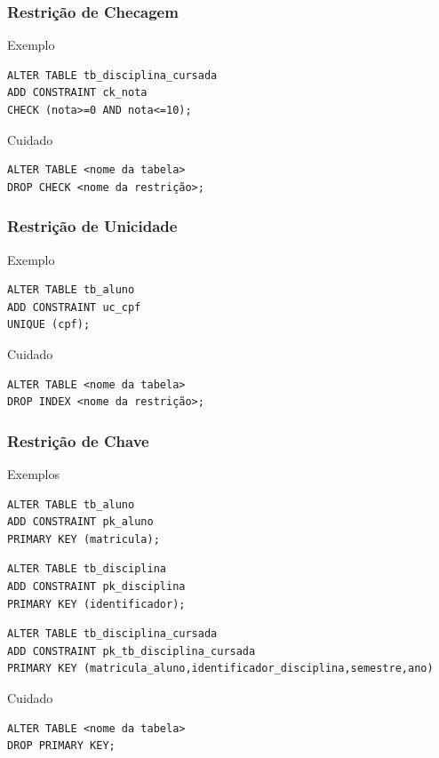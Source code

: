 \documentclass{beamer}
\begin{document}
\begin{frame}[fragile]
\frametitle{Restrição de Checagem}

\begin{exampleblock}{Exemplo}
\begin{lstlisting}
ALTER TABLE tb_disciplina_cursada
ADD CONSTRAINT ck_nota 
CHECK (nota>=0 AND nota<=10);
\end{lstlisting}
\end{exampleblock}\vfill

\begin{alertblock}{Cuidado}
	\begin{lstlisting}
ALTER TABLE <nome da tabela>
DROP CHECK <nome da restrição>;
	\end{lstlisting}
\end{alertblock}
\end{frame}

\begin{frame}[fragile]
\frametitle{Restrição de Unicidade}

\begin{exampleblock}{Exemplo}
	\begin{lstlisting}
ALTER TABLE tb_aluno
ADD CONSTRAINT uc_cpf
UNIQUE (cpf);
	\end{lstlisting}
\end{exampleblock}\vfill

\begin{alertblock}{Cuidado}
	\begin{lstlisting}
ALTER TABLE <nome da tabela>
DROP INDEX <nome da restrição>;
	\end{lstlisting}
\end{alertblock}
\end{frame}

\begin{frame}[fragile]
\frametitle{Restrição de Chave}

\begin{exampleblock}{Exemplos}
	\begin{lstlisting}
ALTER TABLE tb_aluno
ADD CONSTRAINT pk_aluno 
PRIMARY KEY (matricula);
	\end{lstlisting}

	\begin{lstlisting}
ALTER TABLE tb_disciplina
ADD CONSTRAINT pk_disciplina 
PRIMARY KEY (identificador);
	\end{lstlisting}
	
	\begin{lstlisting}
ALTER TABLE tb_disciplina_cursada
ADD CONSTRAINT pk_tb_disciplina_cursada
PRIMARY KEY (matricula_aluno,identificador_disciplina,semestre,ano)	
	\end{lstlisting}
\end{exampleblock}\vfill

\begin{alertblock}{Cuidado}
	\begin{lstlisting}
ALTER TABLE <nome da tabela>
DROP PRIMARY KEY;
	\end{lstlisting}
\end{alertblock}
\end{frame}
\end{document}
